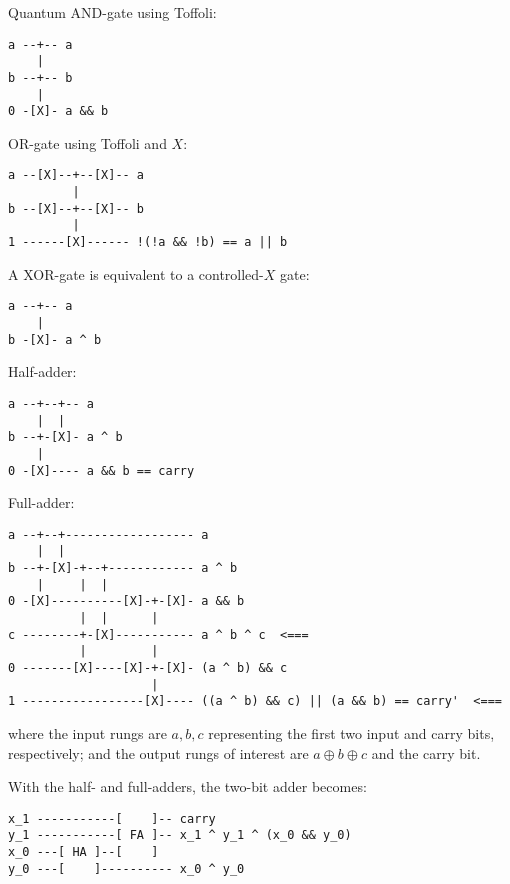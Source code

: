 \begingroup
%
\par Quantum AND-gate using Toffoli:
%
\begin{verbatim}
a --+-- a
    |
b --+-- b
    |
0 -[X]- a && b
\end{verbatim}
%
\par OR-gate using Toffoli and $X$:
%
\begin{verbatim}
a --[X]--+--[X]-- a
         |
b --[X]--+--[X]-- b
         |
1 ------[X]------ !(!a && !b) == a || b
\end{verbatim}
%
\par A XOR-gate is equivalent to a controlled-$X$ gate:
%
\begin{verbatim}
a --+-- a
    |
b -[X]- a ^ b
\end{verbatim}
%
\par Half-adder:
%
\begin{verbatim}
a --+--+-- a
    |  |
b --+-[X]- a ^ b
    |
0 -[X]---- a && b == carry
\end{verbatim}
%
\par Full-adder:
%
\begin{verbatim}
a --+--+------------------ a
    |  |
b --+-[X]-+--+------------ a ^ b
    |     |  |
0 -[X]----------[X]-+-[X]- a && b
          |  |      |
c --------+-[X]----------- a ^ b ^ c  <===
          |         |
0 -------[X]----[X]-+-[X]- (a ^ b) && c
                    |
1 -----------------[X]---- ((a ^ b) && c) || (a && b) == carry'  <===
\end{verbatim}
%
where the input rungs are $a, b, c$ representing the first two input and carry bits, respectively; and the output rungs of interest are $a \oplus b \oplus c$ and the carry bit.
%
\par With the half- and full-adders, the two-bit adder becomes:
%
\begin{verbatim}
x_1 -----------[    ]-- carry
y_1 -----------[ FA ]-- x_1 ^ y_1 ^ (x_0 && y_0)
x_0 ---[ HA ]--[    ]
y_0 ---[    ]---------- x_0 ^ y_0
\end{verbatim}
\endgroup
